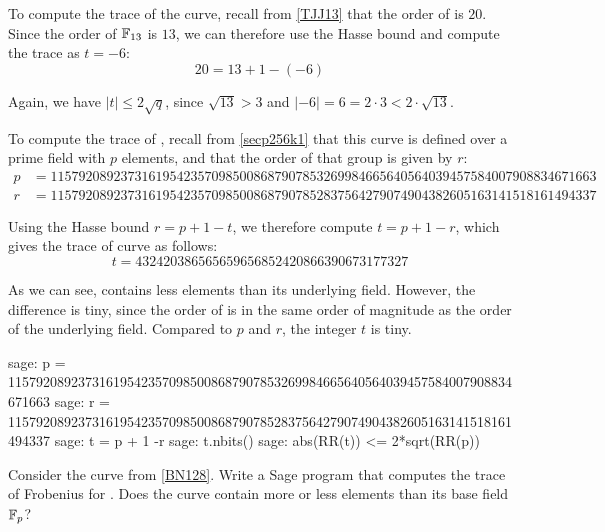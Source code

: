 \begin{example}\label{ex:TJJ13-frobenius} To compute the trace of the  curve, recall from \examplename{} \ref{TJJ13} that the order of \TJJ{} is $20$. Since the order of $\mathbb{F}_{13}$ is $13$, we can therefore use the Hasse bound and compute the trace as $t=-6$:
\begin{equation}
20 = 13 + 1 - (-6)
\end{equation}

Again, we have $|t| \leq 2\sqrt{q}$, since $\sqrt{13}> 3$ and 
$|-6|= 6 = 2\cdot 3< 2\cdot \sqrt{13}$.
\end{example}

\begin{example}\label{ex:secp256k1-trace}To compute the trace of , recall from \examplename{} \ref{secp256k1} that this curve is defined over a prime field with $p$ elements, and that the order of that group is given by $r$:  
\begin{align*}
p &= \scriptstyle 115792089237316195423570985008687907853269984665640564039457584007908834671663\\
r &= \scriptstyle 115792089237316195423570985008687907852837564279074904382605163141518161494337
\end{align*}

Using the Hasse bound $r = p + 1 -t$, we therefore compute $t= p+1 -r$, which gives the trace of curve  as follows:
$$
t = \scriptstyle 432420386565659656852420866390673177327
$$

As we can see,  contains less elements than its underlying field. However,  the difference is tiny, since the order of  is in the same order of magnitude as the order of the underlying field. Compared to $p$ and $r$, the integer $t$ is tiny.

\begin{sagecommandline}
sage: p = 115792089237316195423570985008687907853269984665640564039457584007908834671663
sage: r = 115792089237316195423570985008687907852837564279074904382605163141518161494337
sage: t = p + 1 -r
sage: t.nbits()
sage: abs(RR(t)) <= 2*sqrt(RR(p))
\end{sagecommandline}
\end{example} 
\begin{exercise}
\label{exercise:BN128-trace}
Consider the curve  from \examplename{} \ref{BN128}. Write a Sage program that computes the trace of Frobenius for . Does the curve contain more or less elements than its base field $\mathbb{F}_p$?
\end{exercise}

